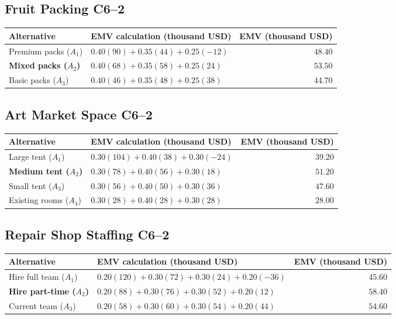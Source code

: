 {\subsection{Fruit Packing \hfill C6--2}
\label{summary:fruit-packing}
\begin{center}
\begin{tabular}{@{}llr@{}}\toprule
Alternative & EMV calculation (thousand USD) & EMV (thousand USD)\\\midrule
Premium packs ($A_1$) & $0.40(90)+0.35(44)+0.25(-12)$ & $48.40$\\
\textbf{Mixed packs ($A_2$)} & $0.40(68)+0.35(58)+0.25(24)$ & $\boldsymbol{53.50}$\\
Basic packs ($A_3$) & $0.40(46)+0.35(48)+0.25(38)$ & $44.70$\\
\bottomrule\end{tabular}
\end{center}
\subsection{Art Market Space \hfill C6--2}
\label{summary:art-market-space}
\begin{center}
\begin{tabular}{@{}llr@{}}\toprule
Alternative & EMV calculation (thousand USD) & EMV (thousand USD)\\\midrule
Large tent ($A_1$) & $0.30(104)+0.40(38)+0.30(-24)$ & $39.20$\\
\textbf{Medium tent ($A_2$)} & $0.30(78)+0.40(56)+0.30(18)$ & $\boldsymbol{51.20}$\\
Small tent ($A_3$) & $0.30(56)+0.40(50)+0.30(36)$ & $47.60$\\
Existing rooms ($A_4$) & $0.30(28)+0.40(28)+0.30(28)$ & $28.00$\\
\bottomrule\end{tabular}
\end{center}
\subsection{Repair Shop Staffing \hfill C6--2}
\label{summary:repair-shop-staffing}
\begin{center}
\begin{tabular}{@{}llr@{}}\toprule
Alternative & EMV calculation (thousand USD) & EMV (thousand USD)\\\midrule
Hire full team ($A_1$) & $0.20(120)+0.30(72)+0.30(24)+0.20(-36)$ & $45.60$\\
\textbf{Hire part-time ($A_2$)} & $0.20(88)+0.30(76)+0.30(52)+0.20(12)$ & $\boldsymbol{58.40}$\\
Current team ($A_3$) & $0.20(58)+0.30(60)+0.30(54)+0.20(44)$ & $54.60$\\
\bottomrule\end{tabular}
\end{center}
\clearpage
}
